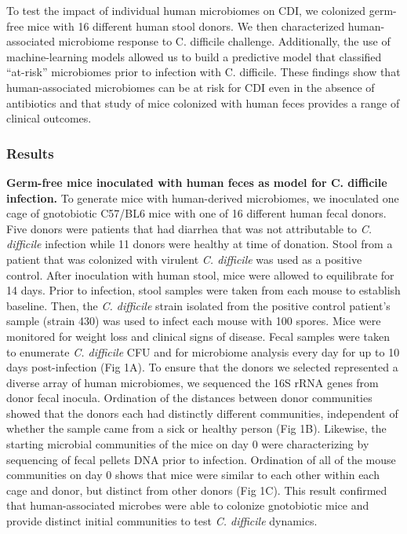 \documentclass[]{article}
\begin{document}
To test the impact of individual human microbiomes on CDI, we colonized
germ-free mice with 16 different human stool donors. We then
characterized human-associated microbiome response to C. difficile
challenge. Additionally, the use of machine-learning models allowed us
to build a predictive model that classified ``at-risk'' microbiomes
prior to infection with C. difficile. These findings show that
human-associated microbiomes can be at risk for CDI even in the absence
of antibiotics and that study of mice colonized with human feces
provides a range of clinical outcomes.

\subsubsection{Results}\label{results}

\textbf{Germ-free mice inoculated with human feces as model for C.
difficile infection.} To generate mice with human-derived microbiomes,
we inoculated one cage of gnotobiotic C57/BL6 mice with one of 16
different human fecal donors. Five donors were patients that had
diarrhea that was not attributable to \emph{C. difficile} infection
while 11 donors were healthy at time of donation. Stool from a patient
that was colonized with virulent \emph{C. difficile} was used as a
positive control. After inoculation with human stool, mice were allowed
to equilibrate for 14 days. Prior to infection, stool samples were taken
from each mouse to establish baseline. Then, the \emph{C. difficile}
strain isolated from the positive control patient's sample (strain 430)
was used to infect each mouse with 100 spores. Mice were monitored for
weight loss and clinical signs of disease. Fecal samples were taken to
enumerate \emph{C. difficile} CFU and for microbiome analysis every day
for up to 10 days post-infection (Fig 1A). To ensure that the donors we
selected represented a diverse array of human microbiomes, we sequenced
the 16S rRNA genes from donor fecal inocula. Ordination of the distances
between donor communities showed that the donors each had distinctly
different communities, independent of whether the sample came from a
sick or healthy person (Fig 1B). Likewise, the starting microbial
communities of the mice on day 0 were characterizing by sequencing of
fecal pellets DNA prior to infection. Ordination of all of the mouse
communities on day 0 shows that mice were similar to each other within
each cage and donor, but distinct from other donors (Fig 1C). This
result confirmed that human-associated microbes were able to colonize
gnotobiotic mice and provide distinct initial communities to test
\emph{C. difficile} dynamics.
\end{document}
